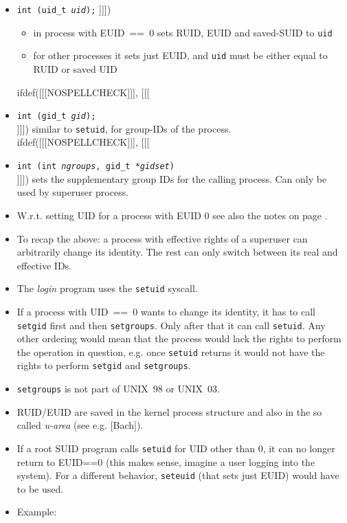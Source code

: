 \begin{slide}
\begin{itemize}
ifdef([[[NOSPELLCHECK]]], [[[
\item \texttt{int (uid\_t \emph{uid});}
]]])
    \begin{itemize}
    \item in process with EUID~==~0 sets RUID, EUID and saved-SUID to
    \texttt{uid}
    \item for other processes it sets just EUID, and \texttt{uid} must be
    either equal to RUID or saved UID
    \end{itemize}
ifdef([[[NOSPELLCHECK]]], [[[
\item \texttt{int (gid\_t \emph{gid});} \\
]]])
similar to \texttt{setuid}, for group-IDs of the process.
ifdef([[[NOSPELLCHECK]]], [[[
\item \texttt{int (int \emph{ngroups},
gid\_t *\emph{gidset})} \\
]]])
sets the supplementary group IDs for the calling process. Can only be used
by superuser process.
\end{itemize}
\end{slide}

\begin{itemize}
\item W.r.t. setting UID for a process with EUID 0 see also the notes on page
\pageref{ROOT_SETUID}.
\item To recap the above: a process with effective rights of a superuser can
arbitrarily change its identity. The rest can only switch between its real and
effective IDs.
\item The \emph{login} program uses the \texttt{setuid} syscall.
\item If a process with UID~==~0 wants to change its identity, it has to call
\texttt{setgid} first and then \texttt{setgroups}. Only after that it can call
\texttt{setuid}. Any other ordering would mean that the process would lack the
rights to perform the operation in question, e.g. once \texttt{setuid} returns
it would not have the rights to perform \texttt{setgid} and \texttt{setgroups}.
\item \texttt{setgroups} is not part of UNIX~98 or UNIX~03.
\item RUID/EUID are saved in the kernel process structure and also in the so
called \emph{u-area} (see e.g. [Bach]).
\item If a root SUID program calls \texttt{setuid} for UID other than 0, it can
no longer return to EUID==0 (this makes sense, imagine a user logging into the
system). For a different behavior, \texttt{seteuid} (that sets just EUID) would
have to be used.
\item Example: 
\end{itemize}

